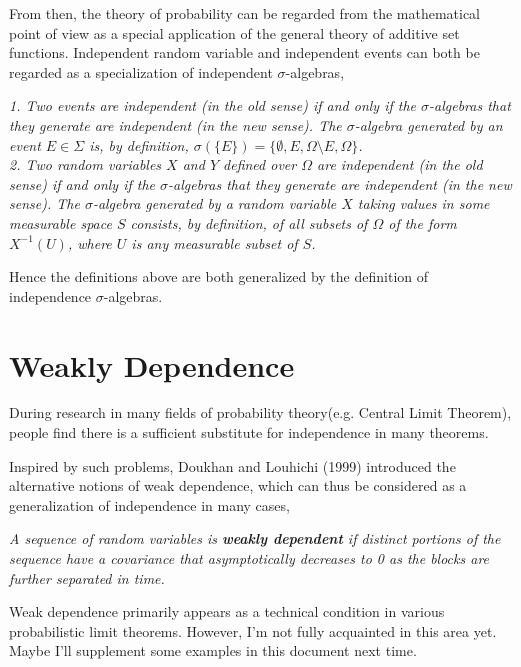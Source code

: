 \documentclass{article}
\begin{document}
From then, the theory of probability can be regarded from the mathematical point of view as a special application of the general theory of additive set functions. Independent random variable and independent events can both be regarded as a specialization of independent $\sigma$-algebras,
\begin{tcolorbox}[colback=black!0!white,colframe=red!75!black]
\slshape
1. Two events are independent (in the old sense) if and only if the $\sigma$-algebras that they generate are independent (in the new sense). The $\sigma$-algebra generated by an event $E\in \Sigma$  is, by definition,
$\sigma (\{E\})=\{\emptyset ,E,\Omega \setminus E,\Omega \}$.\\
2. Two random variables $X$ and $Y$ defined over $\Omega$ are independent (in the old sense) if and only if the $\sigma$-algebras that they generate are independent (in the new sense). The $\sigma$-algebra generated by a random variable $X$ taking values in some measurable space $S$ consists, by definition, of all subsets of $\Omega$  of the form $X^{-1}(U)$, where $U$ is any measurable subset of $S$.
\end{tcolorbox}

Hence the definitions above are both generalized by the definition of independence $\sigma$-algebras.

\section{Weakly Dependence}
During research in many fields of probability theory(e.g. Central Limit Theorem), people find there is a sufficient substitute for independence in many theorems. 

Inspired by such problems, Doukhan and Louhichi (1999) introduced  the alternative notions of weak dependence\cite{doukhan2008notion}, which can thus be considered as a generalization of independence in many cases,
\begin{tcolorbox}[colback=black!0!white,colframe=red!75!black]
\slshape
A sequence of random variables is \textbf{weakly dependent} if distinct portions of the sequence have a covariance that asymptotically decreases to 0 as the blocks are further separated in time. 
\end{tcolorbox}

Weak dependence primarily appears as a technical condition in various probabilistic limit theorems. However, I'm not fully acquainted in this area yet. Maybe I'll supplement some examples in this document next time.
\printbibliography
\end{document}

